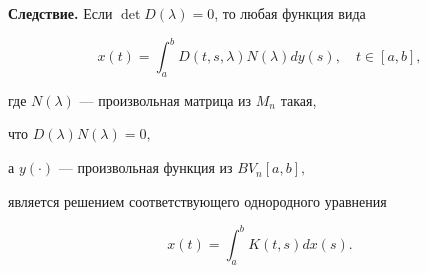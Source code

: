 {\bf Следствие.} Если $\det D(\lambda)=0$, то любая функция вида


$$


x(t)=\int_a^b D(t,s,\lambda)N(\lambda)dy(s),\quad t\in[a,b],


$$


где $N(\lambda)$ --- произвольная матрица из $M_n$ такая,


что $D(\lambda)N(\lambda)=0,$


а $y(\cdot)$ --- произвольная функция из $BV_n[a,b],$


является решением соответствующего однородного уравнения


$$


x(t)=\int_a^b K(t,s)dx(s).


$$





